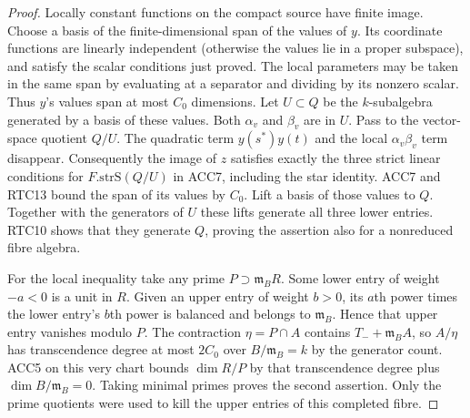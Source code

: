 \begin{proof}
Locally constant functions on the compact source have finite image.
Choose a basis of the finite-dimensional span of the values of \(y\).
Its coordinate functions are linearly independent (otherwise the values
lie in a proper subspace), and satisfy the scalar conditions just proved.
The local parameters may be taken in the same span by evaluating at a
separator and dividing by its nonzero scalar. Thus \(y\)'s values
span at most \(C_0\) dimensions. Let \(U\subset Q\) be the
\(k\)-subalgebra generated by a basis of these values.
Both \(\alpha_v\) and \(\beta_v\) are in \(U\). Pass to the
vector-space quotient \(Q/U\). The quadratic term \(y(s^*)y(t)\)
and the local \(\alpha_v\beta_v\) term disappear. Consequently
the image of \(z\) satisfies exactly the three strict linear
conditions for \(F.\mathrm{strS}(Q/U)\) in ACC7, including the
star identity. ACC7 and RTC13 bound the span of its values by
\(C_0\). Lift a basis of those values to \(Q\).
Together with the generators of \(U\) these lifts generate all
three lower entries. RTC10 shows that they generate \(Q\), proving
the assertion also for a nonreduced fibre algebra.

For the local inequality take any prime \(P\supset\mathfrak m_B R\).
Some lower entry of weight \(-a<0\) is a unit in \(R\). Given an
upper entry of weight \(b>0\), its \(a\)th power times the lower
entry's \(b\)th power is balanced and belongs to \(\mathfrak m_B\).
Hence that upper entry vanishes modulo \(P\). The contraction
\(\eta=P\cap A\) contains \(T_-+\mathfrak m_BA\), so \(A/\eta\)
has transcendence degree at most \(2C_0\) over \(B/\mathfrak m_B=k\)
by the generator count. ACC5 on this very chart bounds \(\dim R/P\)
by that transcendence degree plus \(\dim B/\mathfrak m_B=0\).
Taking minimal primes proves the second assertion. Only the prime
quotients were used to kill the upper entries of this completed fibre.
\end{proof}

